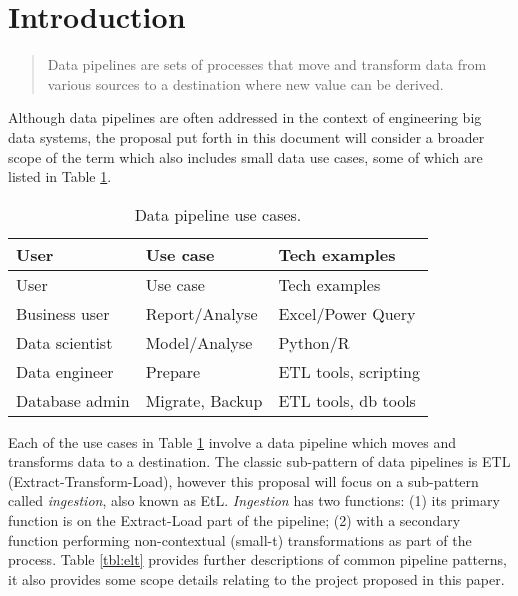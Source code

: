 \section{Introduction}\label{introduction}

\begin{quote}
Data pipelines are sets of processes that move and transform data from
various sources to a destination where new value can be derived.
\citep[p.~1]{pipelines_pocket}
\end{quote}

Although data pipelines are often addressed in the context of
engineering big data systems, the proposal put forth in this document
will consider a broader scope of the term which also includes small data
use cases, some of which are listed in Table \ref{tbl:pipelines}.

\begin{longtable}[]{@{}lll@{}}
\caption{\label{tbl:pipelines}Data pipeline use cases.}\tabularnewline
\toprule\noalign{}
User & Use case & Tech examples \\
\midrule\noalign{}
\endfirsthead
\toprule\noalign{}
User & Use case & Tech examples \\
\midrule\noalign{}
\endhead
\bottomrule\noalign{}
\endlastfoot
Business user & Report/Analyse & Excel/Power Query \\
Data scientist & Model/Analyse & Python/R \\
Data engineer & Prepare & ETL tools, scripting \\
Database admin & Migrate, Backup & ETL tools, db tools \\
\end{longtable}

Each of the use cases in Table \ref{tbl:pipelines} involve a data
pipeline which moves and transforms data to a destination. The classic
sub-pattern of data pipelines is ETL (Extract-Transform-Load), however
this proposal will focus on a sub-pattern called \emph{ingestion}, also
known as EtL. \emph{Ingestion} has two functions: (1) its primary
function is on the Extract-Load part of the pipeline; (2) with a
secondary function performing non-contextual (small-t) transformations
\citep[p.~106]{pipelines_pocket} as part of the process. Table
\ref{tbl:elt} provides further descriptions of common pipeline patterns,
it also provides some scope details relating to the project proposed in
this paper.

